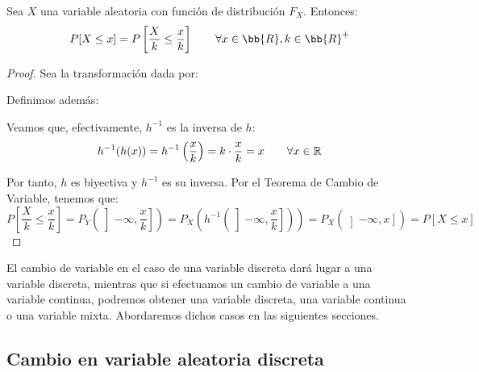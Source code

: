 \begin{coro}
    Sea $X$ una variable aleatoria con función de distribución $F_X$. Entonces:
    \begin{equation*}
        P[X\leq x] = P\left[\frac{X}{k} \leq \frac{x}{k}\right]\qquad \forall x\in \bb{R}, k\in \bb{R}^+
    \end{equation*}
\end{coro}
\begin{proof}
    Sea la transformación dada por:
    
    Definimos además:

    Veamos que, efectivamente, $h^{-1}$ es la inversa de $h$:
    $$h^{-1}(h(x)) = h^{-1}\left(\frac{x}{k}\right) = k\cdot \frac{x}{k} = x\qquad \forall x \in \mathbb R$$

    Por tanto, $h$ es biyectiva y $h^{-1}$ es su inversa. Por el Teorema de Cambio de Variable, tenemos que:
    $$P\left[\frac{X}{k} \leq \frac{x}{k}\right] = P_Y\left(\left]-\infty, \frac{x}{k}\right]\right) = P_X\left(h^{-1}\left(\left]-\infty, \frac{x}{k}\right]\right)\right) = P_X(\left]-\infty, x\right]) = P[X\leq x]$$
\end{proof}

El cambio de variable en el caso de una variable discreta dará lugar a una variable discreta, mientras que
si efectuamos un cambio de variable a una variable continua, podremos obtener una variable discreta, una
variable continua o una variable mixta. Abordaremos dichos casos en las siguientes secciones.
\subsection{Cambio en variable aleatoria discreta}\label{subsec:CV_Discreta}

